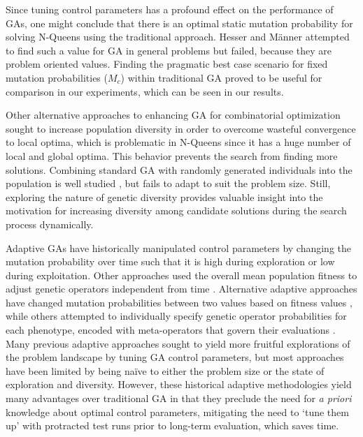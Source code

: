 \documentclass[conference]{IEEEtran}
\begin{document}
Since tuning control parameters has a profound effect on the performance of GAs, one might conclude that there is an optimal static mutation probability \cite{cit:4} for solving N-Queens using the traditional approach. Hesser and M\"{a}nner \cite{cit:14} attempted to find such a value for GA in general problems but failed, because they are problem oriented values. Finding the pragmatic best case scenario for fixed mutation probabilities ($M_{c}$) within traditional GA proved to be useful for comparison in our experiments, which can be seen in our results.

Other alternative approaches to enhancing GA for combinatorial optimization sought to increase population diversity in order to overcome wasteful convergence to local optima, which is problematic in N-Queens since it has a huge number of local and global optima. This behavior prevents the search from finding more solutions. Combining standard GA with randomly generated individuals into the population is well studied \cite{cit:12}, but fails to adapt to suit the problem size. Still, exploring the nature of genetic diversity provides valuable insight into the motivation for increasing diversity among candidate solutions during the search process dynamically.

Adaptive GAs have historically manipulated control parameters by changing the mutation probability over time \cite{cit:12} such that it is high during exploration or low during exploitation. Other approaches used the overall mean population fitness to adjust genetic operators independent from time \cite{cit:11,cit:15,cit:7}. Alternative adaptive approaches have changed mutation probabilities between two values based on fitness values \cite{cit:15}, while others attempted to individually specify genetic operator probabilities for each phenotype, encoded with meta-operators that govern their evaluations \cite{cit:5}. Many previous adaptive approaches sought to yield more fruitful explorations of the problem landscape by tuning GA control parameters, but most approaches have been limited by being na\"{i}ve to either the problem size or the state of exploration and diversity. However, these historical adaptive methodologies yield many advantages over traditional GA in that they preclude the need for \textit{a priori} knowledge about optimal control parameters, mitigating the need to `tune them up' with protracted test runs prior to long-term evaluation, which saves time.
\end{document}
